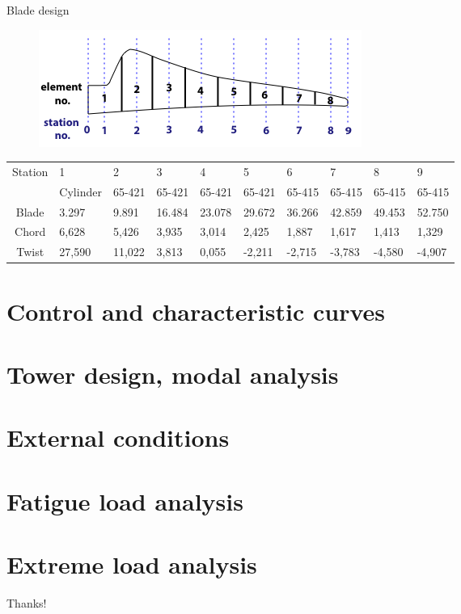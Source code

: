 \documentclass[12pt,t]{beamer}
\begin{document}
\begin{frame}
\huge
Blade design
\Tiny
\begin{figure}[H]
\includegraphics[width=0.6\linewidth]{../CIP_2/Figures/blade_elements.png}
\label{fig:blade_elemets}
\end{figure}

\begin{table}[H]
\begin{tabular}{c| l l l l l l l l l}
\hline
Station  & 	1&	2&	3	&4	&5	&6	&7	&8	&9\\
&Cylinder&65-421&65-421&65-421&65-421& 65-415& 65-415& 65-415&65-415\\
\hline
Blade&	3.297&	9.891&	16.484&	23.078&	29.672&	36.266&	42.859&	49.453&	52.750\\
\hline
Chord &	6,628	&5,426&	3,935	&3,014&	2,425&	1,887&	1,617&	1,413&	1,329\\
Twist &	27,590&	11,022&	3,813&	0,055&	-2,211&	-2,715&	-3,783&	-4,580&	-4,907\\
\hline
\end{tabular}
\label{final_blade_design_schmitz}
\end{table}
\end{frame}


\section{Control and characteristic curves}

\section{Tower design, modal analysis}

\section{External conditions}

\section{Fatigue load analysis}

\section{Extreme load analysis}

\begin{frame}[fragile]
\vspace{100 pt}
\Huge
\begin{center}
Thanks!
\end{center}
\end{frame}
\end{document}
